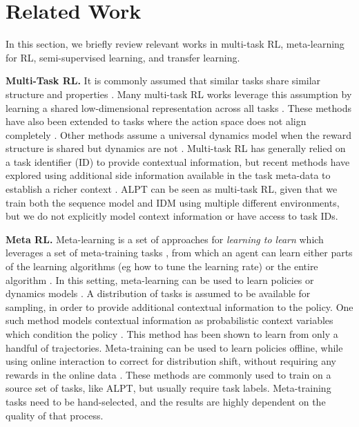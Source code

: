 \documentclass{article} %
\begin{document}
\section{Related Work}
In this section, we briefly review relevant works in multi-task RL, meta-learning for RL, semi-supervised learning, and transfer learning.

\textbf{Multi-Task RL.} It is commonly assumed that  similar tasks share similar structure and properties \citep{10.1023/A:1007379606734, https://doi.org/10.48550/arxiv.1706.05098, 10.1007/978-3-319-10599-4_7, Radford2019LanguageMA}.  Many multi-task RL works leverage this assumption by learning a shared low-dimensional representation across all tasks \citep{NIPS2014_94c7bb58, https://doi.org/10.48550/arxiv.1603.02041, DEramo2020Sharing}.  These methods have also been extended to tasks where the action space does not align completely \citep{10.1007/978-3-030-46133-1_9}.  Other methods assume a  universal dynamics model when the reward structure is shared but dynamics are not \citep{zhang2021learning}.  Multi-task RL has generally relied on a task identifier (ID) to provide contextual information, but recent methods have explored using additional side information available in the task meta-data to establish a richer context \citep{pmlr-v139-sodhani21a}.  ALPT can be seen as multi-task RL, given that we train both the sequence model and IDM using multiple different environments, but we do not explicitly model context information or have access to task IDs.

\textbf{Meta RL.} Meta-learning is a set of approaches for \emph{learning to learn} which leverages a set of meta-training tasks \citep{metarl, 155621}, from which an agent can learn either parts of the learning algorithms (eg how to tune the learning rate) or the entire algorithm \citep{9533842, kalousis2002algorithm}.  %
In this setting, meta-learning can be used to learn policies \citep{duan2017rl, 10.5555/3305381.3305498} or dynamics models \citep{clavera2018learning}.  A distribution of tasks is assumed to be available for sampling, in order to provide additional contextual information to the policy. One such method models contextual information as probabilistic context variables which condition the policy \citep{pmlr-v97-rakelly19a}. This method has been shown to learn from only a handful of trajectories. Meta-training can be used to learn policies offline, while using online interaction to correct for distribution shift, without requiring any rewards in the online data \citep{pmlr-v162-pong22a}. These methods are commonly used to train on a source set of tasks, like  ALPT, but usually require task labels. %
Meta-training tasks need to be   hand-selected, and the results are highly dependent on the quality of that process.
\end{document}
